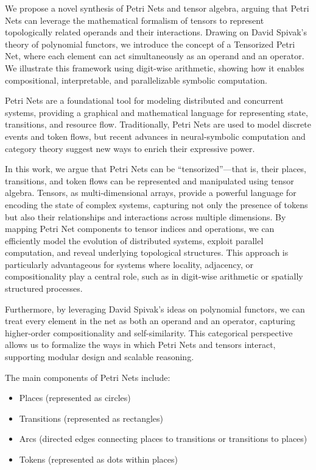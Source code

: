 
We propose a novel synthesis of Petri Nets and tensor algebra, arguing that Petri Nets can leverage the mathematical formalism of tensors to represent topologically related operands and their interactions. Drawing on David Spivak’s theory of polynomial functors, we introduce the concept of a Tensorized Petri Net, where each element can act simultaneously as an operand and an operator. We illustrate this framework using digit-wise arithmetic, showing how it enables compositional, interpretable, and parallelizable symbolic computation.

Petri Nets are a foundational tool for modeling distributed and concurrent systems, providing a graphical and mathematical language for representing state, transitions, and resource flow. Traditionally, Petri Nets are used to model discrete events and token flows, but recent advances in neural-symbolic computation and category theory suggest new ways to enrich their expressive power.

In this work, we argue that Petri Nets can be “tensorized”—that is, their places, transitions, and token flows can be represented and manipulated using tensor algebra. Tensors, as multi-dimensional arrays, provide a powerful language for encoding the state of complex systems, capturing not only the presence of tokens but also their relationships and interactions across multiple dimensions. By mapping Petri Net components to tensor indices and operations, we can efficiently model the evolution of distributed systems, exploit parallel computation, and reveal underlying topological structures. This approach is particularly advantageous for systems where locality, adjacency, or compositionality play a central role, such as in digit-wise arithmetic or spatially structured processes.

Furthermore, by leveraging David Spivak’s ideas on polynomial functors, we can treat every element in the net as both an operand and an operator, capturing higher-order compositionality and self-similarity. This categorical perspective allows us to formalize the ways in which Petri Nets and tensors interact, supporting modular design and scalable reasoning.

The main components of Petri Nets include:
\begin{itemize}
    \item Places (represented as circles)
    \item Transitions (represented as rectangles)
    \item Arcs (directed edges connecting places to transitions or transitions to places)
    \item Tokens (represented as dots within places)
\end{itemize}

